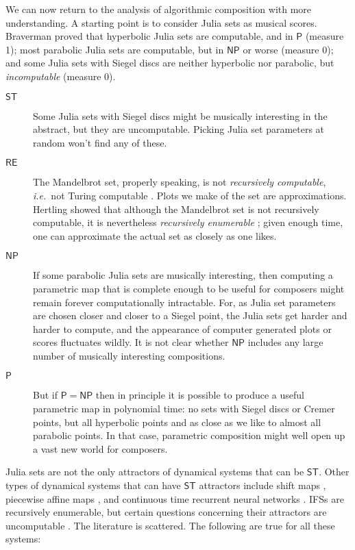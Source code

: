 \documentclass[11pt,papersize=a4]{scrartcl}
\begin{document}
We can now return to the analysis of algorithmic composition with more understanding. A starting point is to consider Julia sets as musical scores. Braverman proved \parencite{braverman2006non, braverman2008computability, braverman2009computability} that hyperbolic Julia sets are computable, and in $\mathsf{P}$ (measure 1); most parabolic Julia sets are computable, but in $\mathsf{NP}$ or worse (measure 0); and some Julia sets with Siegel discs are neither hyperbolic nor parabolic, but \emph{incomputable} (measure 0).
\begin{description}
\item[$\mathsf{ST}$]  Some Julia sets with Siegel discs might be musically interesting in the abstract, but they are uncomputable. Picking Julia set parameters at random won't find any of these.
\item[$\mathsf{RE}$] The Mandelbrot set, properly speaking, is not \emph{recursively computable}, \emph{i.e.}\ not Turing computable \parencite{blum1993godel}. Plots we make of the set are approximations. Hertling showed that although the Mandelbrot set is not recursively computable, it is nevertheless \emph{recursively enumerable} \parencite{Hertling2005-HERITM-3}; given enough time, one can approximate the actual set as closely as one likes. 
\item[$\mathsf{NP}$] If some parabolic Julia sets are musically interesting, then computing a parametric map that is complete enough to be useful for composers might remain forever computationally intractable. For, as Julia set parameters are chosen closer and closer to a Siegel point, the Julia sets get harder and harder to compute, and the appearance of computer generated plots or scores fluctuates wildly. It is not clear whether $\mathsf{NP}$ includes any large number of musically interesting compositions.
\item[$\mathsf{P}$] But if $\mathsf{P} = \mathsf{NP}$ then in principle it is possible to produce a useful parametric map in polynomial time: no sets with Siegel discs or Cremer points, but all hyperbolic points and as close as we like to almost all parabolic points. In that case, parametric composition might well open up a vast new world for composers.
\end{description}

Julia sets are not the only attractors of dynamical systems that can be $\mathsf{ST}$. Other types of dynamical systems that can have $\mathsf{ST}$ attractors include shift maps \parencite{moore1991generalized}, piecewise affine maps \parencite{Bazille_2018}, and continuous time recurrent neural networks \parencite{10531294}. IFSs are recursively enumerable, but certain questions concerning their attractors are uncomputable \parencite{dube1993undecidable}. The literature is scattered. The following are true for all these systems:
\end{document}
